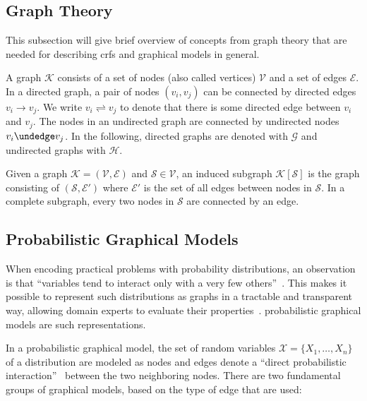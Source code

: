 \subsection{Graph Theory}\label{subsec:graph-theory}

This subsection will give brief overview of concepts from graph theory that are needed for describing \glspl{crf} and graphical models in general.

\bigskip

A \gls{graph} $\mathcal{K}$ consists of a set of \glspl{node} (also called vertices) $\mathcal{V}$ and a set of \glspl{edge} $\mathcal{E}$.
In a directed \gls{graph}, a pair of \glspl{node} $(v_i,v_j)$ can be connected by directed \glspl{edge} $v_i\to v_j$.
We write $v_i\rightleftharpoons v_j$ to denote that there is some directed edge between $v_i$ and $v_j$.
The \glspl{node} in an undirected graph are connected by undirected \glspl{node} $v_i\undedge v_j$.
In the following, directed \glspl{graph} are denoted with $\mathcal{G}$ and undirected \glspl{graph} with $\mathcal{H}$.

Given a \gls{graph} $\mathcal{K} = (\mathcal{V},\mathcal{E})$ and $\mathcal{S}\in\mathcal{V}$, an induced \gls{subgraph} $\mathcal{K}[\mathcal{S}]$ is the \gls{graph} consisting of $(\mathcal{S},\mathcal{E'})$ where $\mathcal{E'}$ is the set of all \glspl{edge} between \glspl{node} in $\mathcal{S}$.
In a complete \gls{subgraph}, every two \glspl{node} in $\mathcal{S}$ are connected by an \gls{edge}.

\subsection{Probabilistic Graphical Models}\label{subsec:graphical-models}
When encoding practical problems with \glspl{probability distribution}, an observation is that ``variables tend to interact only with a very few others''~\citep{koller2009probabilistic}.
This makes it possible to represent such distributions as graphs in a tractable and transparent way, allowing domain experts to evaluate their properties~\citep{koller2009probabilistic}.
\Glspl{probabilistic graphical model} are such representations.

\bigskip

In a \gls{probabilistic graphical model}, the set of \glspl{random variable} $\mathcal{X}=\{X_1,\dots,X_n\}$ of a distribution are modeled as \glspl{node} and \glspl{edge} denote a ``direct probabilistic interaction''~\citep{koller2009probabilistic} between the two neighboring nodes.
There are two fundamental groups of graphical models, based on the type of edge that are used:


